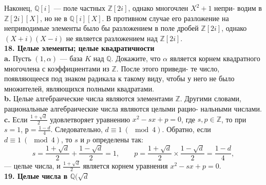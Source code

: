 \documentclass{mai_book}
\begin{document}
Наконец, $\mathbb{Q}[i]$ --- поле частных $\mathbb{Z}[2i]$, однако многочлен $X^2+1$ непри-\linebreak
водим в $\mathbb{Z}[2i][X]$, но не в $\mathbb{Q}[i][X]$. В противном случае его разложение\linebreak
на неприводимые элементы было бы разложением в поле дробей $\mathbb{Z}[2i]$,\linebreak
однако $(X+i)(X-i)$ не является разложением над $\mathbb{Z}[2i]$.\newline
\\
\noindent\textbf{18. Целые элементы; целые квадратичности} \newline 
\\
\hspace*{15pt}\textbf{a.} Пусть $(1,\alpha)$ --- база $K$ над $\mathbb{Q}$. Докажите, что $\alpha$ является корнем\linebreak
квадратного многочлена с коэффициентами из $\mathbb{Z}$. После этого приведи-\linebreak
те число, появляющееся под знаком радикала к такому виду, чтобы у\linebreak
него не было множителей, являющихся полными квадратами.\newline
\\
\hspace*{15pt}\textbf{b.} Целые алгебраические числа являются элементами $\mathbb{Z}$. Другими\linebreak
словами, рациональные алгебраические числа являются целыми рацио-\linebreak
нальными числами.\newline
\\
\hspace*{15pt}\textbf{c.} Если $\frac{1+\sqrt{d}}{2}$ удовлетворяет уравнению $x^2-sx+p=0$, где $s,p\in\mathbb{Z}$,\linebreak
то при $s=1$, $р=\frac{1-d}{4}$. Следовательно, $d\equiv1~(\mod{4})$. Обратно, если\linebreak
$d\equiv1~(\mod{4})$, то $s$ и $p$ определены так:
$$s=\frac{1+\sqrt{d}}{2}+\frac{1-\sqrt{d}}{2}=1,\qquad p=\frac{1+\sqrt{d}}{2}\times\frac{1-\sqrt{d}}{2}=\frac{1-d}{4},$$
\newpage
%
%
\noindent--- целые числа, и $\frac{1+\sqrt{d}}{2}$ является корнем уравнения $x^2-sx+p=0$.\linebreak
\\
\noindent\textbf{19. Целые числа в $\mathbb{Q}(\sqrt{d}$} \newline 
\end{document}

